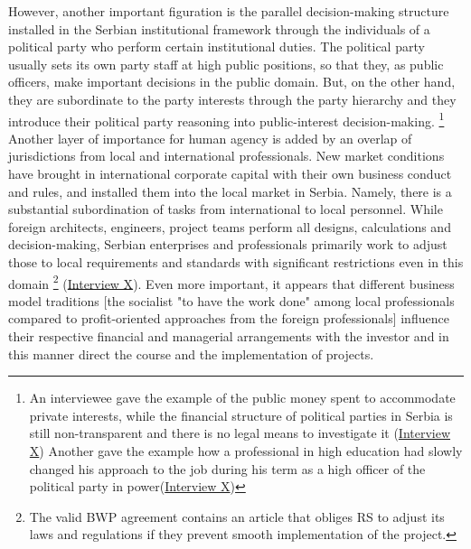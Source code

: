 \documentclass[11pt]{report}
\begin{document}
However, another important figuration is the parallel decision-making structure installed in the Serbian institutional framework through the individuals of a political party who perform certain institutional duties.  The political party usually sets its own party staff at high public positions, so that they, as public officers, make important decisions in the public domain. But, on the other hand, they are subordinate to the party interests through the party hierarchy and they introduce their political party reasoning into public-interest decision-making. 
\footnote
{An interviewee gave the example of the public money spent to accommodate private interests,
while the financial structure of political parties in Serbia is still non-transparent and there is no legal means to investigate it (\href{Annex}
{Interview X})
Another gave the example how a professional in high education had slowly changed his approach to the job during his term as a high officer of the political party in power(\href{Annex}
{Interview X})}
\\

Another layer of importance for human agency is added by an overlap of jurisdictions from local and international professionals.
New market conditions have brought in international corporate capital with their own business conduct and rules, and installed them into the local market in Serbia.  Namely, there is a substantial subordination of tasks from international to local personnel.
While foreign architects, engineers, project teams perform all designs, calculations and decision-making, Serbian enterprises and professionals primarily work to adjust those to local requirements and standards with significant restrictions even in this domain
\footnote{ The valid BWP agreement contains an article that obliges RS to adjust its laws and regulations if they prevent smooth implementation of the project.}
(\href{InterviewX}{Interview X}).
Even more important, it appears that different business model traditions [the socialist "to have the work done" among local professionals compared to profit-oriented approaches from the foreign professionals] influence their respective financial and managerial arrangements with the investor and in this manner direct the course and the implementation of projects.
\end{document}
